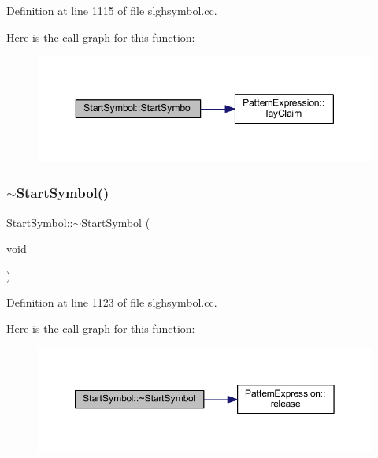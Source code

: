 Definition at line 1115 of file slghsymbol.\+cc.

Here is the call graph for this function\+:
\nopagebreak
\begin{figure}[H]
\begin{center}
\leavevmode
\includegraphics[width=350pt]{class_start_symbol_a2b7b7d19a42d3d5d0c271c81f4a35d31_cgraph}
\end{center}
\end{figure}
\mbox{\label{class_start_symbol_a0154c71a007b7c4dd3e57e4016fc65fc}} 
\subsubsection{\texorpdfstring{$\sim$StartSymbol()}{~StartSymbol()}}
{\footnotesize\ttfamily Start\+Symbol\+::$\sim$\+Start\+Symbol (\begin{DoxyParamCaption}\item[{void}]{ }\end{DoxyParamCaption})\hspace{0.3cm}{\ttfamily [virtual]}}



Definition at line 1123 of file slghsymbol.\+cc.

Here is the call graph for this function\+:
\nopagebreak
\begin{figure}[H]
\begin{center}
\leavevmode
\includegraphics[width=350pt]{class_start_symbol_a0154c71a007b7c4dd3e57e4016fc65fc_cgraph}
\end{center}
\end{figure}


